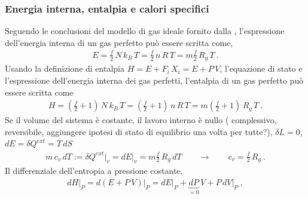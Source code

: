 \documentclass[letterpaper,10pt,italian]{jupyterBook}
\begin{document}
\subsubsection{Energia interna, entalpia e calori specifici}
\label{\detokenize{ch/thermodynamics/ideal-gas-formulas:energia-interna-entalpia-e-calori-specifici}}
\sphinxAtStartPar
{} Seguendo le conclusioni del modello di gas ideale fornito dalla {\hyperref[\detokenize{ch/thermodynamics/ideal-gas-kinetic-theory:physics-hs-thermodynamics-matter-gases-ideal-kinetic-theory}]{}}, l’espressione dell’energia interna di un gas perfetto può essere scritta come,
\begin{equation*}
\begin{split}E = \frac{f}{2} \, N \, k_B \, T = \frac{f}{2} \, n \, R \, T = m \frac{f}{2} \, R_g \, T \ .\end{split}
\end{equation*}
\sphinxAtStartPar
{} Usando la definizione di entalpia \(H = E + F_i \, X_i = E + P \, V\), l’equazione di stato e l’espressione dell’energia interna dei gas perfetti, l’entalpia di un gas perfetto può essere scritta come
\begin{equation*}
\begin{split}H = \left(\frac{f}{2} + 1 \right) \, N \, k_B \, T = \left( \frac{f}{2} + 1 \right) \, n \, R \, T = m \left( \frac{f}{2} + 1 \right) \, R_g \, T \ .\end{split}
\end{equation*}
\sphinxAtStartPar
{} Se il volume del sistema è costante, il lavoro interno è nullo ( complessivo, reversibile, aggiungere ipotesi di stato di equilibrio una volta per tutte?), \(\delta L = 0\), \(dE = \delta Q^{ext} = T \, dS\)
\begin{equation*}
\begin{split}m \, c_v \, d T := \delta Q^{ext}\big|_v = dE\big|_v = m \frac{f}{2} \, R_g \, d T 
\qquad \rightarrow \qquad
c_v = \frac{f}{2} \, R_g \ .\end{split}
\end{equation*}
\sphinxAtStartPar
{} Il differenziale dell’entropia a pressione costante,
\begin{equation*}
\begin{split}dH\big|_P = d ( E + P \, V )\big|_P  = d E\big|_P  + \underbrace{d P}_{=0} \, V + P \, dV\big|_P \ ,\end{split}
\end{equation*}
\end{document}
